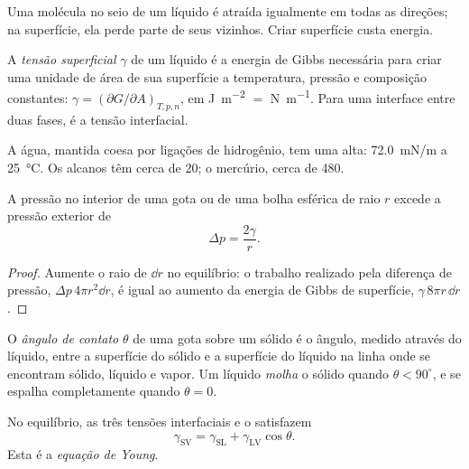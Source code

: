 Uma molécula no seio de um líquido é atraída igualmente em todas as direções; na
superfície, ela perde parte de seus vizinhos. Criar superfície custa energia.

\begin{definition}\label{def:b3:colloids:surface-tension}
A \emph{tensão superficial} $\gamma$ de um líquido é a energia de
Gibbs necessária para criar uma unidade de área de sua superfície a temperatura,
pressão e composição constantes: $\gamma = (\partial G/\partial A)_{T,p,n}$, em \unit{J.m^{-2}} $=$ \unit{N.m^{-1}}. Para
uma interface entre duas fases, é a tensão interfacial.
\end{definition}

A água, mantida coesa por ligações de hidrogênio, tem uma  alta:
\qty{72.0}{mN/m} a \qty{25}{\celsius}. Os alcanos têm cerca de 20; o mercúrio, cerca de 480.

\begin{proposition}\label{prop:b3:colloids:laplace}
A pressão no interior de uma gota ou de uma bolha esférica de raio $r$ excede a
pressão exterior de
\[
  \Delta p = \frac{2\gamma}{r} .
\]
\end{proposition}

\begin{proof}
Aumente o raio de $\dd r$ no equilíbrio: o trabalho realizado pela diferença de
pressão, $\Delta p\,4\pi r^2\dd r$, é igual ao aumento da energia de Gibbs de superfície, $\gamma\,8\pi r\,\dd r$.
\end{proof}

\begin{definition}\label{def:b3:colloids:wetting}
O \emph{ângulo de contato} $\theta$ de uma gota sobre um
sólido é o ângulo, medido através do líquido, entre a superfície do sólido e a
superfície do líquido na linha onde se encontram sólido, líquido e vapor. Um
líquido \emph{molha} o sólido quando $\theta < 90^\circ$, e se espalha
completamente quando $\theta = 0$.
\end{definition}

\begin{theorem}\label{thm:b3:colloids:young}
No equilíbrio, as três tensões interfaciais e o  satisfazem
\[
  \gamma_{\mathrm{SV}} = \gamma_{\mathrm{SL}} + \gamma_{\mathrm{LV}}\cos\theta .
\]
Esta é a \emph{equação de Young}.
\end{theorem}

